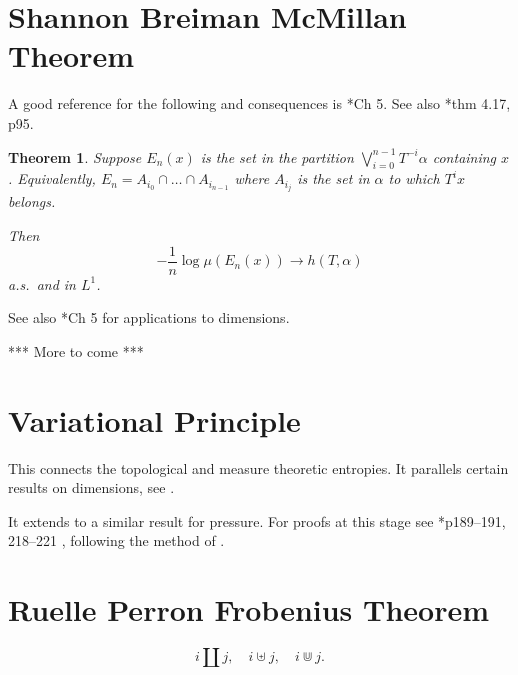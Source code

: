 \documentclass[a4paper]{amsart}
\theoremstyle{plain}
\newtheorem{theorem}{Theorem}[section]
\theoremstyle{definition}
\theoremstyle{remark}
\begin{document}
  
  

\section{\textbf{Shannon Breiman McMillan Theorem}}  
A good reference for the following and consequences is \cite{Bil}*{Ch 5}.  See also \cite{Wal}*{thm 4.17, p95}.


\begin{theorem}
Suppose $ E_n(x) $ is the set in the partition $ \bigvee_{i=0}^{n-1} T^{-i}\alpha  $ containing $ x $.
Equivalently, $ E_n = A_{i_0}\cap\dots \cap A_{i_{n-1}} $ where $ A_{i_j} $ is the set in $ \alpha $ to which $ T^i x$ belongs.

Then
\[
-\frac{1}{n}\log \mu(E_n(x)) \to h(T,\alpha) 
\]
a.s.\ and in $ L^1 $.
\end{theorem}
 
See also \cite{Bil}*{Ch 5} for applications to dimensions.

*** More to come ***



\section{\textbf{Variational Principle}}  

This connects the topological and measure theoretic entropies.  It parallels certain results on dimensions, see \cite{Bed}.

It extends to a  similar result for pressure.  For proofs at this stage see \cite{Wal}*{p189--191, 218--221} , following the method of \cite{Mis1}.

\section{\textbf{Ruelle Perron Frobenius Theorem}}   \label{PFT}


\[  i \amalg j, \quad i \uplus j, \quad i \Cup j . \]




\end{document}

